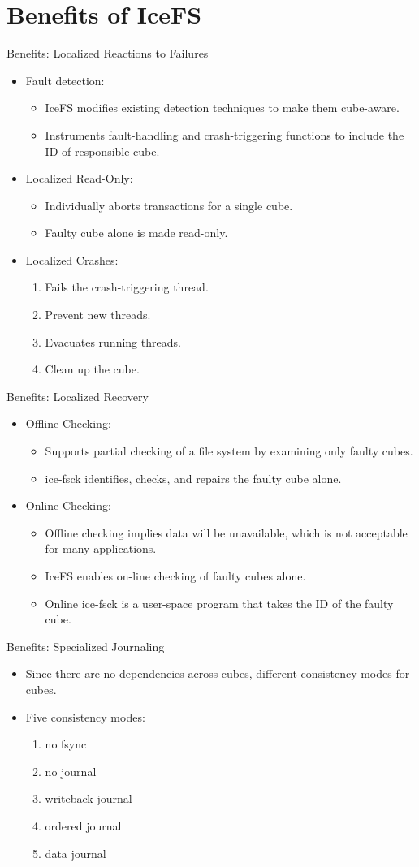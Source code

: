 \documentclass[aspectratio=169]{beamer}
\newcommand{\bi}{\begin{itemize}}
\newcommand{\ei}{\end{itemize}}
\newcommand{\bn}{\begin{enumerate}}
\newcommand{\en}{\end{enumerate}}
\begin{document}
\section{Benefits of IceFS}
\begin{frame}{Benefits: Localized Reactions to Failures}
    \bi
\item Fault detection:
    \bi
\item IceFS modifies existing detection techniques to make them cube-aware.
\item Instruments fault-handling and crash-triggering functions to include the
    ID of responsible cube.
    \ei
\item Localized Read-Only:
    \bi
\item Individually aborts transactions for a single cube.
\item Faulty cube alone is made read-only.
    \ei
\item Localized Crashes:
    \bn
\item Fails the crash-triggering thread.
\item Prevent new threads.
\item Evacuates running threads.
\item Clean up the cube.
    \en
    \ei
\end{frame}

\begin{frame}{Benefits: Localized Recovery} 
    \bi
\item Offline Checking: 
    \bi
\item Supports partial checking of a file system by examining
    only faulty cubes.
\item ice-fsck identifies, checks, and repairs the faulty cube alone.
    \ei
\item Online Checking:
    \bi
\item Offline checking implies data will be unavailable, which is not acceptable
    for many applications.
\item IceFS enables on-line checking of faulty cubes alone.
\item Online ice-fsck is a user-space program that takes the ID of the faulty
    cube.
    \ei
    \ei
\end{frame}

\begin{frame}{Benefits: Specialized Journaling}
    \bi
\item Since there are no dependencies across cubes, different consistency modes
    for cubes.
\item Five consistency modes:
    \bn
\item no fsync
\item no journal
\item writeback journal
\item ordered journal
\item data journal
    \en
    \ei
\end{frame}
\end{document}
